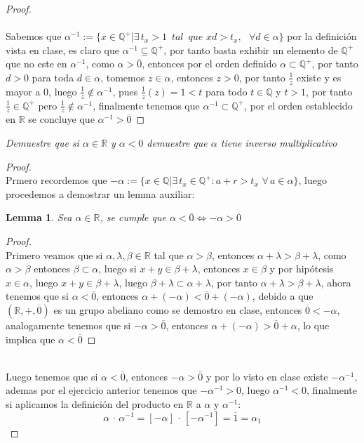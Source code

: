 \documentclass[11pt,letterpaper]{article}
\newtheorem{lemma}[theorem]{Lemma}
\newcommand{\R}{\mathbb{R}}
\newcommand{\Q}{\mathbb{Q}}
\begin{document}
\begin{proof}\,\\
    \,\\
    Sabemos que $\alpha^{-1}:=\{x\in \Q^{+}|\exists\,t_x>1\,\,\,tal\,\,\,que\,\,xd>t_x,\,\,\,\,\forall d\in \alpha\}$ por la definici\'on vista en clase, es claro
    que $\alpha^{-1}\subseteq\Q^{+}$, por tanto basta exhibir un elemento de $\Q^{+}$ que no este en $\alpha^{-1}$, como $\alpha>\overline{0}$, entonces por el orden definido $\alpha\subset \Q^+$, por tanto $d>0$ para toda $d\in \alpha$, tomemos
    $z\in \alpha$, entonces $z>0$, por tanto $\frac{1}{z}$ existe y es mayor a $0$, luego $\frac{1}{z}\notin \alpha^{-1}$, pues $\frac{1}{z}(z)=1<t$ para todo $t\in \Q$ y $t>1$, por tanto $\frac{1}{z}\in \Q^+$ pero $\frac{1}{z}\notin \alpha^{-1}$, finalmente
    tenemos que $\alpha^{-1}\subset \Q^{+} $, por el orden establecido en $\R$ se concluye que $\alpha^{-1}>\overline{0}$
\end{proof}
\newpage
\begin{tcolorbox}[
	title = \textcolor{black}{\textcolor{white}{Problema 3}},]
\textit{Demuestre que si $\alpha \in \R$ y $\alpha<0$ demuestre que $\alpha$ tiene inverso multiplicativo}
\end{tcolorbox}
\begin{proof}\,\\
    Prmero recordemos que $-\alpha:=\{x\in \Q|\exists\,t_x\in \Q^+:a+r>t_x\,\,\forall\,a\in \alpha\}$, luego procedemos a demostrar un lemma
    auxiliar:\,\\
    \begin{lemma}
        Sea $\alpha\in \R$, se cumple que $\alpha<\overline{0}\Leftrightarrow-\alpha>\overline{0}$
    \end{lemma}
    \begin{proof}
        \,\\
        Primero veamos que si $\alpha,\lambda,\beta\in \R$ tal que $\alpha>\beta$, entonces $\alpha+\lambda>\beta+\lambda$, como
        $\alpha>\beta$ entonces $\beta\subset \alpha$, luego si $x+y\in \beta+\lambda$, entonces $x\in \beta$ y por hip\'otesis $x\in \alpha$, luego
        $x+y\in \beta+\lambda$, luego $\beta+\lambda\subset\alpha+\lambda$, por tanto $\alpha+\lambda>\beta+\lambda$, ahora tenemos que
        si $\alpha<\overline{0}$, entonces $\alpha+(-\alpha)<\overline{0}+(-\alpha)$, debido a que $(\R,+,\overline{0})$ es un grupo abeliano como se demostro en clase, entonces
        $\overline{0}<-\alpha$, analogamente tenemos que si $-\alpha>\overline{0}$, entonces $\alpha+(-\alpha)>\overline{0}+\alpha$, lo que implica
        que $\alpha<\overline{0}$
    \end{proof}\,\\
    Luego tenemos que si $\alpha<\overline{0}$, entonces $-\alpha>\overline{0}$ y por lo visto en clase existe $-\alpha^{-1}$, ademas por el ejercicio
    anterior tenemos que $-\alpha^{-1}>0$, luego $\alpha^{-1}<0$, finalmente si aplicamos la definici\'on del producto en $\R$ a
    $\alpha$ y $\alpha^{-1}$:\,\\
    \begin{equation*}
        \alpha\,\cdot\,\alpha^{-1}=[-\alpha]\,\cdot\,[-\alpha^{-1}]=\overline{1}=\alpha_{1}
    \end{equation*}
\end{proof}
\end{document}
